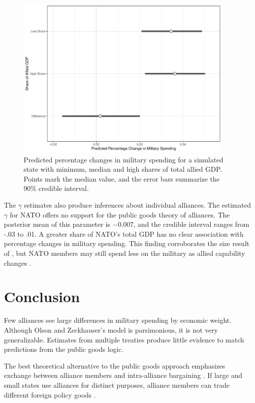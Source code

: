 \documentclass[12pt]{article}
\begin{document}
\begin{figure}[htbp]
	\centering
		\includegraphics[width=0.95\textwidth]{pred-change-share.pdf}
	\caption{Predicted percentage changes in military spending for a simulated state with minimum, median and high shares of total allied GDP. Points mark the median value, and the error bars summarize the 90\% credible interval.}
	\label{fig:pred-change-share}
\end{figure}


The $\gamma$ estimates also produce inferences about individual alliances.
The estimated $\gamma$ for NATO offers no support for the public goods theory of alliances. 
The posterior mean of this parameter is $-0.007$, and the credible interval ranges from -.03 to .01.  
A greater share of NATO's total GDP has no clear association with percentage changes in military spending. 
This finding corroborates the size result of \citet{PluemperNeumayer2015}, but NATO members may still spend less on the military as allied capability changes \citep{GeorgeSandler2017}.


\section{Conclusion}

Few alliances see large differences in military spending by economic weight. 
Although Olson and Zeckhauser's model is parsimonious, it is not very generalizable. 
Estimates from multiple treaties produce little evidence to match predictions from the public goods logic. 


The best theoretical alternative to the public goods approach emphasizes exchange between alliance members and intra-alliance bargaining \citep{Norrlof2010, Brooksetal2013, Kim2016}. 
If large and small states use alliances for distinct purposes, alliance members can trade different foreign policy goods \citep{Morrow1991, Johnson2015}. 
\end{document}
